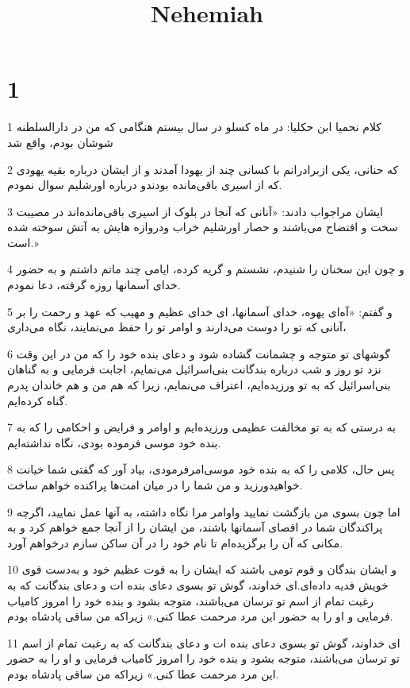 

\title{Nehemiah}

 
\chapter{1}

\par 1 کلام نحمیا ابن حکلیا: در ماه کسلو در سال بیستم هنگامی که من در دارالسلطنه شوشان بودم، واقع شد
\par 2 که حنانی، یکی ازبرادرانم با کسانی چند از یهودا آمدند و از ایشان درباره بقیه یهودی که از اسیری باقی‌مانده بودندو درباره اورشلیم سوال نمودم.
\par 3 ایشان مراجواب دادند: «آنانی که آنجا در بلوک از اسیری باقی‌مانده‌اند در مصیبت سخت و افتضاح می‌باشند و حصار اورشلیم خراب ودروازه هایش به آتش سوخته شده است.»
\par 4 و چون این سخنان را شنیدم، نشستم و گریه کرده، ایامی چند ماتم داشتم و به حضور خدای آسمانها روزه گرفته، دعا نمودم.
\par 5 و گفتم: «آه‌ای یهوه، خدای آسمانها، ای خدای عظیم و مهیب که عهد و رحمت را بر آنانی که تو را دوست می‌دارند و اوامر تو را حفظ می‌نمایند، نگاه می‌داری،
\par 6 گوشهای تو متوجه و چشمانت گشاده شود و دعای بنده خود را که من در این وقت نزد تو روز و شب درباره بندگانت بنی‌اسرائیل می‌نمایم، اجابت فرمایی و به گناهان بنی‌اسرائیل که به تو ورزیده‌ایم، اعتراف می‌نمایم، زیرا که هم من و هم خاندان پدرم گناه کرده‌ایم.
\par 7 به درستی که به تو مخالفت عظیمی ورزیده‌ایم و اوامر و فرایض و احکامی را که به بنده خود موسی فرموده بودی، نگاه نداشته‌ایم.
\par 8 پس حال، کلامی را که به بنده خود موسی‌امرفرمودی، بیاد آور که گفتی شما خیانت خواهیدورزید و من شما را در میان امت‌ها پراکنده خواهم ساخت.
\par 9 اما چون بسوی من بازگشت نمایید واوامر مرا نگاه داشته، به آنها عمل نمایید، اگر‌چه پراکندگان شما در اقصای آسمانها باشند، من ایشان را از آنجا جمع خواهم کرد و به مکانی که آن را برگزیده‌ام تا نام خود را در آن ساکن سازم درخواهم آورد.
\par 10 و ایشان بندگان و قوم تومی باشند که ایشان را به قوت عظیم خود و به‌دست قوی خویش فدیه داده‌ای.‌ای خداوند، گوش تو بسوی دعای بنده ات و دعای بندگانت که به رغبت تمام از اسم تو ترسان می‌باشند، متوجه بشود و بنده خود را امروز کامیاب فرمایی و او را به حضور این مرد مرحمت عطا کنی.» زیراکه من ساقی پادشاه بودم.
\par 11 ‌ای خداوند، گوش تو بسوی دعای بنده ات و دعای بندگانت که به رغبت تمام از اسم تو ترسان می‌باشند، متوجه بشود و بنده خود را امروز کامیاب فرمایی و او را به حضور این مرد مرحمت عطا کنی.» زیراکه من ساقی پادشاه بودم.
 
